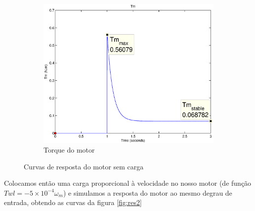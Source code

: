 \documentclass{article}
\begin{document}
\begin{figure}[H]
\begin{subfigure}[b]{0.49\linewidth}
		\centering
		\includegraphics[width=\linewidth]{matlab/tm1}
		\caption{Torque do motor}
	\end{subfigure}
	\caption{Curvas de resposta do motor sem carga}
	\label{fig:res1}
\end{figure}

Colocamos então uma carga proporcional à velocidade no nosso motor (de função $Twl = - 5\times10^{-4}\omega_m$) e simulamos a resposta do motor ao mesmo degrau de entrada, obtendo as curvas da figura \ref{fig:res2}
\end{document}
